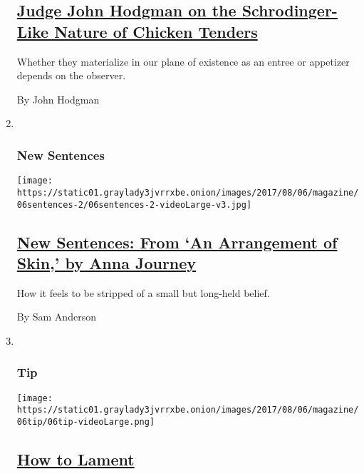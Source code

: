 \begin{enumerate}
  \hypertarget{judge-john-hodgman-on-the-schrodinger-like-nature-of-chicken-tenders}{%
  \subsection{\texorpdfstring{\href{/2017/08/04/magazine/judge-john-hodgman-on-the-schrodinger-like-nature-of-chicken-tenders.html}{Judge
  John Hodgman on the Schrodinger-Like Nature of Chicken
  Tenders}}{Judge John Hodgman on the Schrodinger-Like Nature of Chicken Tenders}}\label{judge-john-hodgman-on-the-schrodinger-like-nature-of-chicken-tenders}}

  Whether they materialize in our plane of existence as an entree or
  appetizer depends on the observer.

  By John Hodgman
\item ~
  \hypertarget{new-sentences}{%
  \subsubsection{New Sentences}\label{new-sentences}}

  \texttt{[image: https://static01.graylady3jvrrxbe.onion/images/2017/08/06/magazine/06sentences-2/06sentences-2-videoLarge-v3.jpg]}

  \hypertarget{new-sentences-from-an-arrangement-of-skin-by-anna-journey}{%
  \subsection{\texorpdfstring{\href{/2017/08/04/magazine/new-sentences-from-an-arrangement-of-skin-by-anna-journey.html}{New
  Sentences: From `An Arrangement of Skin,' by Anna
  Journey}}{New Sentences: From `An Arrangement of Skin,' by Anna Journey}}\label{new-sentences-from-an-arrangement-of-skin-by-anna-journey}}

  How it feels to be stripped of a small but long-held belief.

  By Sam Anderson
\item ~
  \hypertarget{tip}{%
  \subsubsection{Tip}\label{tip}}

  \texttt{[image: https://static01.graylady3jvrrxbe.onion/images/2017/08/06/magazine/06tip/06tip-videoLarge.png]}

  \hypertarget{how-to-lament}{%
  \subsection{\texorpdfstring{\href{/2017/08/04/magazine/how-to-lament.html}{How
  to Lament}}{How to Lament}}\label{how-to-lament}}


\end{enumerate}
